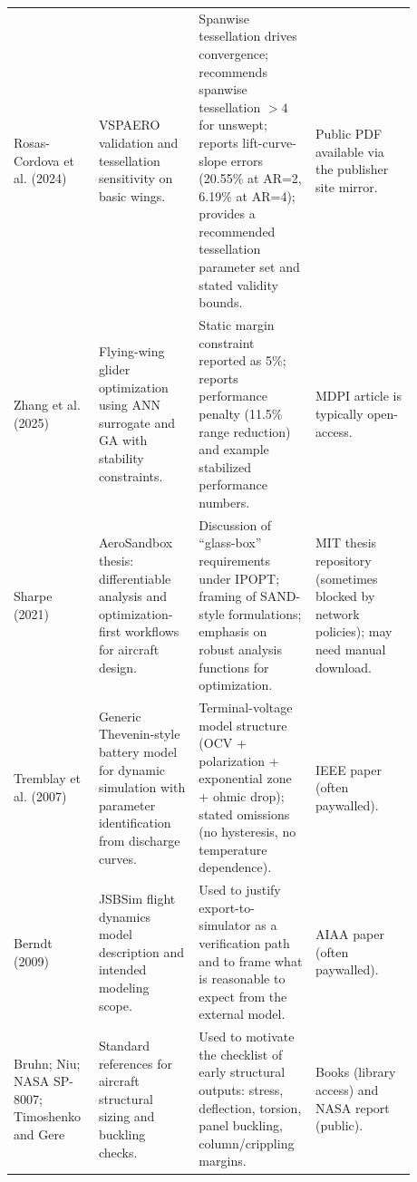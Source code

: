 \begin{longtable}{p{0.16\linewidth} p{0.23\linewidth} p{0.26\linewidth} p{0.23\linewidth}}
Rosas-Cordova et al. (2024) \cite{RosasCordova2024VSPAERO} &
VSPAERO validation and tessellation sensitivity on basic wings. &
Spanwise tessellation drives convergence; recommends spanwise tessellation $>4$ for unswept; reports lift-curve-slope errors (20.55\% at AR=2, 6.19\% at AR=4); provides a recommended tessellation parameter set and stated validity bounds. &
Public PDF available via the publisher site mirror. \\

Zhang et al. (2025) \cite{Zhang2025ANNGA} &
Flying-wing glider optimization using ANN surrogate and GA with stability constraints. &
Static margin constraint reported as 5\%; reports performance penalty (11.5\% range reduction) and example stabilized performance numbers. &
MDPI article is typically open-access. \\

Sharpe (2021) \cite{Sharpe2021AeroSandbox} &
AeroSandbox thesis: differentiable analysis and optimization-first workflows for aircraft design. &
Discussion of ``glass-box'' requirements under IPOPT; framing of SAND-style formulations; emphasis on robust analysis functions for optimization. &
MIT thesis repository (sometimes blocked by network policies); may need manual download. \\

Tremblay et al. (2007) \cite{Tremblay2007Battery} &
Generic Thevenin-style battery model for dynamic simulation with parameter identification from discharge curves. &
Terminal-voltage model structure (OCV + polarization + exponential zone + ohmic drop); stated omissions (no hysteresis, no temperature dependence). &
IEEE paper (often paywalled). \\

Berndt (2009) \cite{Berndt2009JSBSim} &
JSBSim flight dynamics model description and intended modeling scope. &
Used to justify export-to-simulator as a verification path and to frame what is reasonable to expect from the external model. &
AIAA paper (often paywalled). \\

Bruhn; Niu; NASA SP-8007; Timoshenko and Gere \cite{Bruhn,Niu,NASASP8007,TimoshenkoGere} &
Standard references for aircraft structural sizing and buckling checks. &
Used to motivate the checklist of early structural outputs: stress, deflection, torsion, panel buckling, column/crippling margins. &
Books (library access) and NASA report (public). \\

\end{longtable}
\endgroup

